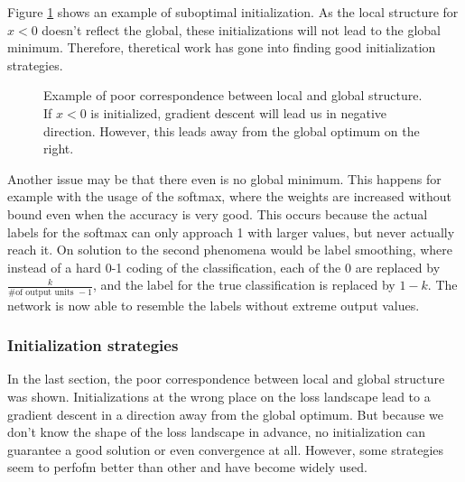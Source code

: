 Figure \ref{fig:Poor_correspondence}
shows an example of suboptimal initialization. As the local structure for $x<0$
doesn't reflect the global, these initializations will not lead to the global
minimum. Therefore, theretical work has gone into finding good initialization
strategies.

\begin{figure}[h]\label{fig:Poor_correspondence}
    \begin{center}
        \caption{Example of poor correspondence between local and global
        structure. If $x<0$ is initialized, gradient descent will lead us in
        negative direction. However, this leads away from the global optimum
        on the right.}
    \end{center}
\end{figure}

Another issue may be that there even is no global minimum. This happens for
example with the usage of the softmax, where the weights are increased without
bound even when the accuracy is very good. This occurs because the actual labels
for the softmax can only approach 1 with larger values, but never actually reach
it.  On solution to the second phenomena would be label smoothing, where instead
of a hard 0-1 coding of the classification, each of the 0 are replaced by
$\frac{k}{\textrm{\# of output units }-1}$, and the label for the true
classification is replaced by $1-k$. The network is now able to
resemble the labels without extreme output values.


\subsubsection{Initialization strategies}\label{sub:Initialization_strategies}
In the last section, the poor correspondence between local and global structure
was shown. Initializations at the wrong place on the loss landscape lead to a
gradient descent in a direction away from the global optimum. But because we
don't know the shape of the loss landscape in advance, no initialization can
guarantee a good solution or even convergence at all. However, some strategies
seem to perfofm better than other and have become widely used.

